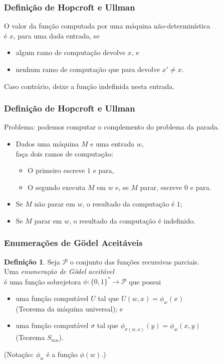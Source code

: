 \documentclass[utf8,notheorems]{beamer}
\theoremstyle{definition}
\newtheorem*{definition}{Definição}
\begin{document}
\begin{frame}
    \frametitle{Definição de Hopcroft e Ullman}
    O valor da função computada por uma máquina não-determinística \\
    é $x$, para uma dada entrada, se
    \begin{itemize}
        \item algum ramo de computação devolve $x$, e
        \item nenhum ramo de computação que para devolve $x' \neq x$.
    \end{itemize}
    Caso contrário, deixe a função indefinida nesta entrada.
    \cite[p.~313]{HopcroftUllman1979}
\end{frame}

\begin{frame}
    \frametitle{Definição de Hopcroft e Ullman}
    Problema: podemos computar o complemento do problema da parada.
    \begin{itemize}
        \item Dados uma máquina $M$ e uma entrada $w$, \\
            faça dois ramos de computação:
            \begin{itemize}
                \item O primeiro escreve $1$ e para,
                \item O segundo executa $M$ em $w$ e, se $M$ parar,
                    escreve $0$ e para.
            \end{itemize}
        \item Se $M$ não parar em $w$,
            o resultado da computação é $1$;
        \item Se $M$ parar em $w$,
            o resultado da computação é indefinido.
    \end{itemize}
\end{frame}

\begin{frame}
    \frametitle{Enumerações de Gödel Aceitáveis}
    \begin{definition}
        Seja $\mathcal P$ o conjunto das funções recursivas parciais. \\
        Uma \emph{enumeração de Gödel aceitável} \\
        é uma função sobrejetora \alert<2>{$\phi: \{0, 1\}^* \to \mathcal P$} que possui
        \begin{itemize}
            \item uma função computável $U$ tal que $U(w, x) = \phi_w(x)$ \\
                (Teorema da máquina universal); e
            \item uma função computável $\sigma$ tal que
                    $\phi_{\sigma(w, x)}(y) = \phi_w(x, y)$ \\
                (Teorema $S_{mn}$).
        \end{itemize}
        {\cite[p.~41]{Rogers1987}}

        (Notação: $\phi_w$ é a função $\phi(w)$.)
    \end{definition}
\end{frame}
\end{document}
